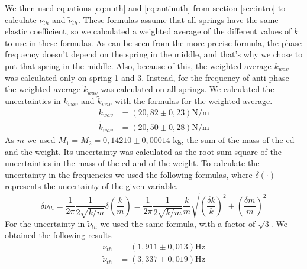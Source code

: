 \documentclass{article}
\begin{document}
We then used equations \ref{eq:nuth} and \ref{eq:antinuth} from section \ref{sec:intro} to calculate $\nu_{th}$
and $\tilde \nu_{th}$. These formulas assume that all springs have
the same elastic coefficient, so we calculated a weighted average of
the different values of $k$ to use in these formulas. As can be seen from the more precise formula, the phase
frequency doesn't depend on the spring in the middle, and that's why we chose to put that spring in the middle. Also, because of this, the weighted average $k_{wav}$ was calculated only on spring 1 and 3.
Instead, for the frequency of anti-phase the weighted average 
$\tilde k_{wav}$ was calculated on all springs. We calculated the uncertainties in $k_{wav}$ and $\tilde k_{wav}$ with the formulas for the weighted average. 
\begin{align}
           k_{wav} &= (20,82 \pm 0,23) \text{N/m} \\
    \tilde k_{wav} &= (20,50 \pm 0,28) \text{N/m}
\end{align}
As $m$ we used $M_1=M_2=0,14210 \pm 0,00014$ kg, the sum of the mass of the cd and the weight. Its uncertainty was calculated as the root-sum-square of the uncertainties in the mass of the cd and of the weight.
To calculate the uncertainty in the frequencies we used the following formulas, where $\delta(\cdot)$ represents the uncertainty of the given variable.
\begin{equation} \label{eq:inc_nuth}
    \delta \nu_{th}
    = \frac{1}{2\pi} \frac{1}{2\sqrt{k/m}} \delta \left ( \frac{k}{m} \right )
    = \frac{1}{2\pi} \frac{1}{2\sqrt{k/m}}  \frac{k}{m} \sqrt{ \left ( \frac{ \delta k}{k}  \right ) ^2 +
           \left ( \frac{ \delta m}{m}  \right ) ^2}
\end{equation}
For the uncertainty in $\tilde \nu_{th}$ we used the same formula, with a factor of $\sqrt 3$. We obtained the following results
\begin{align}
           \nu_{th} &= (1,911 \pm 0,013) \text{Hz}\\
    \tilde \nu_{th} &= (3,337 \pm 0,019) \text{Hz}
\end{align}
\end{document}
